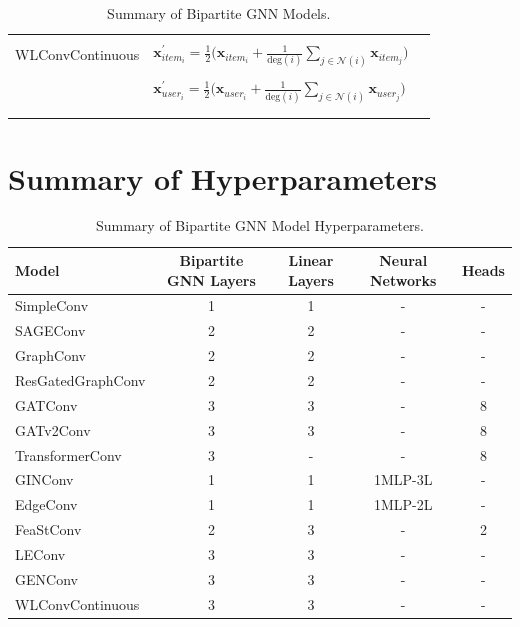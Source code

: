 \documentclass{scrartcl}
\begin{document}
\begin{appendices}
\begin{longtable}{|l|l|l|}
    \rowcolor[gray]{0.9} & \\
    \rowcolor[gray]{0.9} WLConvContinuous &     $\mathbf{x}^{\prime}_{item_{i}} = \frac{1}{2}\big(\mathbf{x}_{item_{i}} +
    \frac{1}{\textrm{deg}(i)}
    \sum_{j \in \mathcal{N}(i)}  \mathbf{x}_{item_{j}} \big)$ \\
    \rowcolor[gray]{0.9} & \\
    \rowcolor[gray]{0.9} & $\mathbf{x}^{\prime}_{user_{i}} = \frac{1}{2}\big(\mathbf{x}_{user_{i}} +
    \frac{1}{\textrm{deg}(i)}
    \sum_{j \in \mathcal{N}(i)} \mathbf{x}_{user_{j}} \big)$ \\
    \rowcolor[gray]{0.9} & \\
    
    \hline
    \caption{Summary of Bipartite GNN Models.}
    \label{tab:recall}
\end{longtable}

\clearpage

\section{Summary of Hyperparameters}\label{secA2}
 
\begin{table}[htbp]
    \centering
    \begin{tabular}{|l|c|c|c|c|} %
    \hline
    \textbf{Model} & \textbf{Bipartite GNN Layers} & \textbf{Linear Layers} & \textbf{Neural Networks} & \textbf{Heads} \\ %
    \hline
    \rowcolor[gray]{0.9} SimpleConv & 1 & 1 & - & - \\
    SAGEConv & 2 & 2 & - & - \\
    \rowcolor[gray]{0.9} GraphConv & 2 & 2 & - & - \\
    ResGatedGraphConv & 2 & 2 & - & - \\
    \rowcolor[gray]{0.9} GATConv & 3 & 3 & - & 8 \\
    GATv2Conv & 3 & 3 & - & 8 \\
    \rowcolor[gray]{0.9} TransformerConv & 3 & - & - & 8 \\
    GINConv & 1 & 1 & 1MLP-3L & - \\
    \rowcolor[gray]{0.9} EdgeConv & 1 & 1 & 1MLP-2L & - \\
    FeaStConv & 2 & 3 & - & 2 \\
    \rowcolor[gray]{0.9} LEConv & 3 & 3 & - & - \\
    GENConv & 3 & 3 & - & - \\
    \rowcolor[gray]{0.9} WLConvContinuous & 3 & 3 & - & - \\
    \hline
    \end{tabular}
    \caption{Summary of Bipartite GNN Model Hyperparameters.}
    \label{tab:hyperparameters}
\end{table}


\end{appendices}
\end{document}
